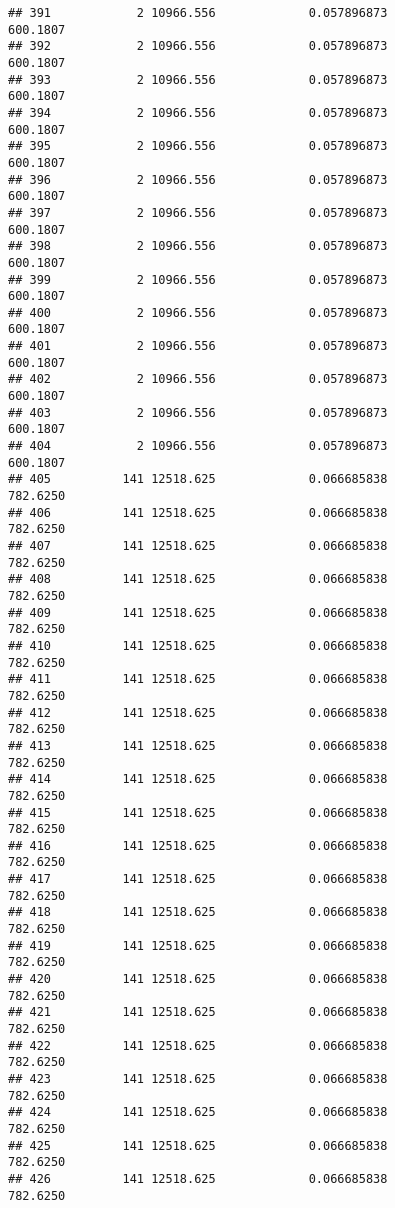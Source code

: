 \documentclass[]{article}
\begin{document}
\begin{verbatim}
## 391            2 10966.556             0.057896873           600.1807
## 392            2 10966.556             0.057896873           600.1807
## 393            2 10966.556             0.057896873           600.1807
## 394            2 10966.556             0.057896873           600.1807
## 395            2 10966.556             0.057896873           600.1807
## 396            2 10966.556             0.057896873           600.1807
## 397            2 10966.556             0.057896873           600.1807
## 398            2 10966.556             0.057896873           600.1807
## 399            2 10966.556             0.057896873           600.1807
## 400            2 10966.556             0.057896873           600.1807
## 401            2 10966.556             0.057896873           600.1807
## 402            2 10966.556             0.057896873           600.1807
## 403            2 10966.556             0.057896873           600.1807
## 404            2 10966.556             0.057896873           600.1807
## 405          141 12518.625             0.066685838           782.6250
## 406          141 12518.625             0.066685838           782.6250
## 407          141 12518.625             0.066685838           782.6250
## 408          141 12518.625             0.066685838           782.6250
## 409          141 12518.625             0.066685838           782.6250
## 410          141 12518.625             0.066685838           782.6250
## 411          141 12518.625             0.066685838           782.6250
## 412          141 12518.625             0.066685838           782.6250
## 413          141 12518.625             0.066685838           782.6250
## 414          141 12518.625             0.066685838           782.6250
## 415          141 12518.625             0.066685838           782.6250
## 416          141 12518.625             0.066685838           782.6250
## 417          141 12518.625             0.066685838           782.6250
## 418          141 12518.625             0.066685838           782.6250
## 419          141 12518.625             0.066685838           782.6250
## 420          141 12518.625             0.066685838           782.6250
## 421          141 12518.625             0.066685838           782.6250
## 422          141 12518.625             0.066685838           782.6250
## 423          141 12518.625             0.066685838           782.6250
## 424          141 12518.625             0.066685838           782.6250
## 425          141 12518.625             0.066685838           782.6250
## 426          141 12518.625             0.066685838           782.6250

\end{verbatim}
\end{document}
